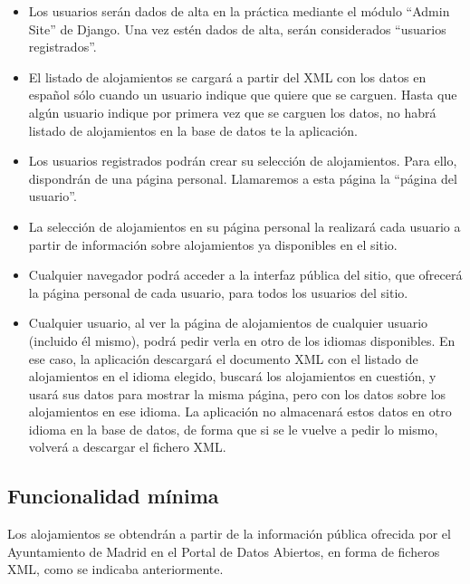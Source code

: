 \begin{itemize}
  \item Los usuarios serán dados de alta en la práctica mediante el módulo ``Admin Site'' de Django. Una vez estén dados de alta, serán considerados ``usuarios registrados''.

  \item El listado de alojamientos se cargará a partir del XML con los datos en español sólo cuando un usuario indique que quiere que se carguen. Hasta que algún usuario indique por primera vez que se carguen los datos, no habrá listado de alojamientos en la base de datos te la aplicación.

  \item Los usuarios registrados podrán crear su selección de alojamientos. Para ello, dispondrán de una página personal. Llamaremos a esta página la ``página del usuario''.

  \item La selección de alojamientos en su página personal la realizará cada usuario a partir de información sobre alojamientos ya disponibles en el sitio.

  \item Cualquier navegador podrá acceder a la interfaz pública del sitio, que ofrecerá la página personal de cada usuario, para todos los usuarios del sitio.

  \item Cualquier usuario, al ver la página de alojamientos de cualquier usuario (incluido él mismo), podrá pedir verla en otro de los idiomas disponibles. En ese caso, la aplicación descargará el documento XML con el listado de alojamientos en el idioma elegido, buscará los alojamientos en cuestión, y usará sus datos para mostrar la misma página, pero con los datos sobre los alojamientos en ese idioma. La aplicación no almacenará estos datos en otro idioma en la base de datos, de forma que si se le vuelve a pedir lo mismo, volverá a descargar el fichero XML. 
\end{itemize}


\subsection{Funcionalidad mínima}

Los alojamientos se obtendrán a partir de la información pública ofrecida por el Ayuntamiento de Madrid en el Portal de Datos Abiertos, en forma de ficheros XML, como se indicaba anteriormente.

